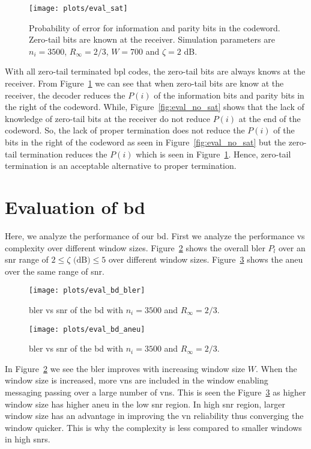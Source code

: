 \begin{figure}[htbp]
  \centering
  \texttt{[image: plots/eval\_sat]}
  \caption{Probability of error for information and parity bits in the codeword. Zero-tail bits are known at the receiver. Simulation parameters are $n_i=3500$, $R_\infty=2/3$, $W=700$ and $\zeta=2$ dB.}
  \label{fig:eval_sat}
\end{figure}

With all zero-tail terminated \gls{bpl} codes, the zero-tail bits are always knows at the receiver. 
From Figure~\ref{fig:eval_sat} we can see that when zero-tail bits are know at the receiver, the decoder reduces the $P(i)$ of the information bits and parity bits in the right of the codeword. While, Figure~\ref{fig:eval_no_sat} shows that the lack of knowledge of zero-tail bits at the receiver do not reduce $P(i)$ at the end of the codeword. So, the lack of proper termination does not reduce the $P(i)$ of the bits in the right of the codeword as seen in Figure~\ref{fig:eval_no_sat} but the zero-tail termination reduces the $P(i)$ which is seen in Figure~\ref{fig:eval_sat}. Hence, zero-tail termination is an acceptable alternative to proper termination.
 
\section{Evaluation of \acrfull{bd}}
Here, we analyze the performance of our \gls{bd}. First we analyze the performance vs complexity over different window sizes. Figure~\ref{fig:eval_bd_bler} shows the overall \gls{bler} $P_l$ over an \gls{snr} range of $2\leq\zeta\text{ (dB)}\leq 5$ over different window sizes. Figure~\ref{fig:eval_bd_aneu} shows the \gls{aneu} over the same range of \gls{snr}.
\begin{figure}[htbp]
  \centering
  \texttt{[image: plots/eval\_bd\_bler]}
  \caption{\gls{bler} vs \gls{snr} of the \acrfull{bd} with $n_i=3500$ and $R_\infty=2/3$.}
  \label{fig:eval_bd_bler}
\end{figure}
\begin{figure}[htbp]
   \centering
  \texttt{[image: plots/eval\_bd\_aneu]}
  \caption{\gls{bler} vs \gls{snr} of the \acrfull{bd} with $n_i=3500$ and $R_\infty=2/3$.}
  \label{fig:eval_bd_aneu}
\end{figure}

In Figure~\ref{fig:eval_bd_bler} we see the \gls{bler} improves with increasing window size $W$. When the window size is increased, more \glspl{vn} are included in the window enabling messaging passing over a large number of \glspl{vn}. This is seen the Figure~\ref{fig:eval_bd_aneu} as higher window size has higher \gls{aneu} in the low \gls{snr} region. In high \gls{snr} region, larger window size has an advantage in improving the \gls{vn} reliability thus converging the window quicker. This is why the complexity is less compared to smaller windows in high \glspl{snr}.


